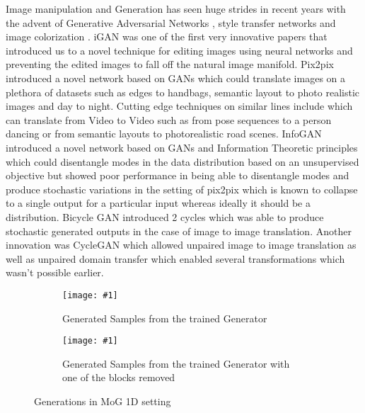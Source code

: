 Image manipulation and Generation has seen huge strides in recent years with the advent of Generative Adversarial Networks \cite{goodfellow2014generative}, style transfer networks \cite{gatys2015neural} and image colorization \cite{zhang2016colorful}. iGAN \cite{zhu2016generative} was one of the first very innovative papers that introduced us to a novel technique for editing images using neural networks and preventing the edited images to fall off the natural image manifold. Pix2pix \cite{isola2016image2image} introduced a novel network based on GANs which could translate images on a plethora of datasets such as edges to handbags, semantic layout to photo realistic images and day to night. Cutting edge techniques on similar lines include \cite{wang2018video} which can translate from Video to Video such as from pose sequences to a person dancing or from semantic layouts to photorealistic road scenes. InfoGAN \cite{chen2016infogan} introduced a novel network based on GANs and Information Theoretic principles which could disentangle modes in the data distribution based on an unsupervised objective but showed poor performance in being able to disentangle modes and produce stochastic variations in the setting of pix2pix which is known to collapse to a single output for a particular input whereas ideally it should be a distribution. Bicycle GAN \cite{zhu2017toward} introduced 2 cycles which was able to produce stochastic generated outputs in the case of image to image translation. Another innovation was CycleGAN \cite{zhu2017unpaired} which allowed unpaired image to image translation as well as unpaired domain transfer which enabled several transformations which wasn't possible earlier. 

\newcommand{\addSubFigHalf}[3]{\begin{subfigure}[t]{.45\linewidth}
   \texttt{[image: \#1]}
   \caption{#2}\label{#3}\end{subfigure}
}

\begin{figure}[t]
    \centering
    \addSubFigHalf{Picture33.png}{Generated Samples from the trained Generator}{fig:1d_gen} 
    \addSubFigHalf{Picture3.png}{Generated Samples from the trained Generator with one of the blocks removed}{fig:1d_gen_rem} 
    \caption{Generations in MoG 1D setting}
    \label{fig:infogan_bags}
    \vspace{-3mm}
\end{figure}
